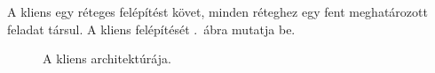 \documentclass[11pt, a4paper]{article}
\begin{document}
	A kliens egy réteges felépítést követ, minden réteghez egy fent meghatározott feladat társul. A kliens felépítését .~ábra mutatja be.
	       \begin{figure}[htbp]
	       	\center
	       	\caption{A kliens architektúrája.}
	       	\label{fig:client-arch}
	       \end{figure}
	
\end{document}
